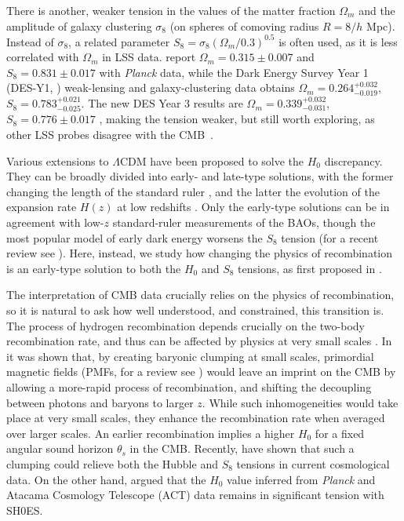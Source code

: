 There is another, weaker tension in the values of the matter fraction $\Omega_m$ and the amplitude of galaxy clustering $\sigma_8$ (on spheres of comoving radius $R=8/h$ Mpc).
Instead of $\sigma_8$, a related parameter $S_8=\sigma_8\left(\Omega_m/0.3\right)^{0.5}$ is often used, as it is less correlated with $\Omega_m$ in LSS data.
\citet{Planck2018-cosmo} report $\Omega_m=0.315\pm 0.007$ and $S_8=0.831\pm 0.017$ with {\it Planck} data, while the Dark Energy Survey Year 1 (DES-Y1, \cite{DES-Y1}) weak-lensing and galaxy-clustering data obtains $\Omega_m=0.264^{+0.032}_{-0.019}$, $S_8=0.783^{+0.021}_{-0.025}$.
The new DES Year 3 results are $\Omega_m=0.339^{+0.032}_{-0.031}$, $S_8=0.776\pm0.017$ \citep{DES-Y3}, making the tension weaker, but still worth exploring,
as other LSS probes disagree with the CMB~\citep{KiDS-1000,unWISE-plancklensing,dens-perturb-growth,cmb-lss-disagree1,cmb-lss-disagree2,cmb-lss-disagree3}.

Various extensions to $\Lambda$CDM have been proposed to solve the $H_0$ discrepancy. They can be broadly divided into early- and late-type solutions, with the former changing the length of the standard ruler \citep{early-sol19ede,early-sol19rock,early-sol19ade,early-sol20edenu,early-sol20nu}, and the latter the evolution of the expansion rate $H(z)$ at low redshifts \citep{late-sol17,late-sol18,late-sol20a,late-sol20b}. Only the early-type solutions can be in agreement with low-$z$ standard-ruler measurements of the BAOs, though the most popular model of early dark energy \citep{EDE-issue} worsens the $S_8$ tension (for a recent review see \citet{hubble-tension-guide}). 
Here, instead, we study how changing the physics of recombination is an early-type solution to both the $H_0$ and $S_8$ tensions, as first proposed in \cite{JP20}.

The interpretation of CMB data crucially relies on the physics of recombination, so it is natural to ask how well understood, and constrained, this transition is.
The process of hydrogen recombination depends crucially on the two-body recombination rate, and thus can be affected by physics at very small scales \citep{PMF11}.
In \cite{PMF04,PMF13,PMF19} it was shown that, by creating baryonic clumping at small scales, primordial magnetic fields (PMFs, for a review see \citet{PMF-review}) would leave an imprint on the CMB by allowing a more-rapid process of recombination, and shifting the decoupling between photons and baryons to larger $z$.
While such inhomogeneities would take place at very small scales, they enhance the recombination rate when averaged over larger scales. 
An earlier recombination implies a higher $H_0$ for a fixed angular sound horizon $\theta_s$ in the CMB. Recently, \citet{JP20} have shown that such a clumping could relieve both the Hubble and $S_8$ tensions in current cosmological data.
On the other hand, \citet{clumping-ACT} argued that the $H_0$ value inferred from {\it Planck} and Atacama Cosmology Telescope (ACT) data remains in significant tension with SH0ES.

